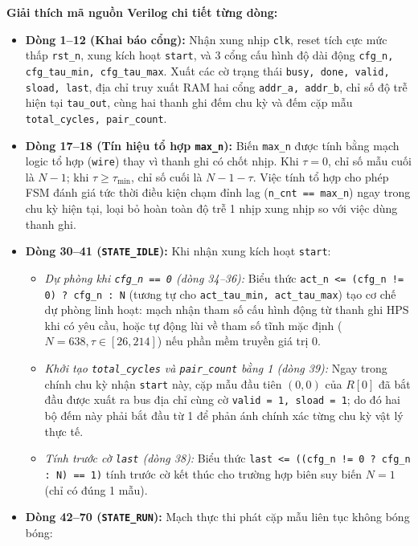 \textbf{Giải thích mã nguồn Verilog chi tiết từng dòng:}
\begin{itemize}[leftmargin=1.5em, itemsep=2pt]
    \item \textbf{Dòng 1--12 (Khai báo cổng):} Nhận xung nhịp \texttt{clk}, reset tích cực mức thấp \texttt{rst\_n}, xung kích hoạt \texttt{start}, và 3 cổng cấu hình độ dài động \texttt{cfg\_n, cfg\_tau\_min, cfg\_tau\_max}. Xuất các cờ trạng thái \texttt{busy, done, valid, sload, last}, địa chỉ truy xuất RAM hai cổng \texttt{addr\_a, addr\_b}, chỉ số độ trễ hiện tại \texttt{tau\_out}, cùng hai thanh ghi đếm chu kỳ và đếm cặp mẫu \texttt{total\_cycles, pair\_count}.
    \item \textbf{Dòng 17--18 (Tín hiệu tổ hợp \texttt{max\_n}):} Biến \texttt{max\_n} được tính bằng mạch logic tổ hợp (\texttt{wire}) thay vì thanh ghi có chốt nhịp. Khi $\tau = 0$, chỉ số mẫu cuối là $N-1$; khi $\tau \ge \tau_{\min}$, chỉ số cuối là $N - 1 - \tau$. Việc tính tổ hợp cho phép FSM đánh giá tức thời điều kiện chạm đỉnh lag (\texttt{n\_cnt == max\_n}) ngay trong chu kỳ hiện tại, loại bỏ hoàn toàn độ trễ 1 nhịp xung nhịp so với việc dùng thanh ghi.
    \item \textbf{Dòng 30--41 (\texttt{STATE\_IDLE}):} Khi nhận xung kích hoạt \texttt{start}:
    \begin{itemize}[leftmargin=1.2em, itemsep=2pt]
        \item \emph{Dự phòng khi \texttt{cfg\_n == 0} (dòng 34--36):} Biểu thức \texttt{act\_n <= (cfg\_n != 0) ? cfg\_n : N} (tương tự cho \texttt{act\_tau\_min, act\_tau\_max}) tạo cơ chế dự phòng linh hoạt: mạch nhận tham số cấu hình động từ thanh ghi HPS khi có yêu cầu, hoặc tự động lùi về tham số tĩnh mặc định ($N=638, \tau \in [26, 214]$) nếu phần mềm truyền giá trị 0.
        \item \emph{Khởi tạo \texttt{total\_cycles} và \texttt{pair\_count} bằng 1 (dòng 39):} Ngay trong chính chu kỳ nhận \texttt{start} này, cặp mẫu đầu tiên $(0, 0)$ của $R[0]$ đã bắt đầu được xuất ra bus địa chỉ cùng cờ \texttt{valid = 1, sload = 1}; do đó hai bộ đếm này phải bắt đầu từ 1 để phản ánh chính xác từng chu kỳ vật lý thực tế.
        \item \emph{Tính trước cờ \texttt{last} (dòng 38):} Biểu thức \texttt{last <= ((cfg\_n != 0 ? cfg\_n : N) == 1)} tính trước cờ kết thúc cho trường hợp biên suy biến $N=1$ (chỉ có đúng 1 mẫu).
    \end{itemize}
    \item \textbf{Dòng 42--70 (\texttt{STATE\_RUN}):} Mạch thực thi phát cặp mẫu liên tục không bóng bóng:

\end{itemize}
